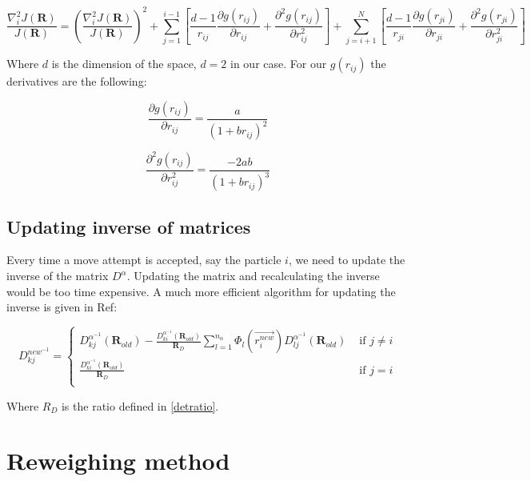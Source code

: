 \begin{equation}
  \dfrac{\nabla_i^2J(\bm{R})}{J(\bm{R})}=\left(\dfrac{\nabla_i^2J(\bm{R})}{J(\bm{R})}\right)^2
  + \sum_{j=1}^{i-1}\left[ \dfrac{d-1}{r_{ij}}\dfrac{\partial g(r_{ij})}{\partial r_{ij}} + \dfrac{\partial^2g(r_{ij})}{\partial r_{ij}^2} \right]
  + \sum_{j=i+1}^N\left[ \dfrac{d-1}{r_{ji}}\dfrac{\partial g(r_{ji})}{\partial r_{ji}} + \dfrac{\partial^2g(r_{ji})}{\partial r_{ji}^2} \right]
\end{equation}

Where $d$ is the dimension of the space, $d=2$ in our case.
For our $g(r_{ij})$ the derivatives are the following:

\begin{equation}
  \dfrac{\partial g(r_{ij})}{\partial r_{ij}}=\dfrac{a}{(1+br_{ij})^2}
\end{equation}

\begin{equation}
  \dfrac{\partial^2 g(r_{ij})}{\partial r_{ij}^2}=\dfrac{-2ab}{(1+br_{ij})^3}
\end{equation}

\subsection{Updating inverse of matrices}

Every time a move attempt is accepted, say the particle $i$, we need to update the inverse of the matrix $D^\alpha$.
Updating the matrix and recalculating the inverse would be too time expensive.
A much more efficient algorithm for updating the inverse is given in Ref\cite{notesOslo,MCMAbInitioQuantumChemistry,larsevind}:

\begin{equation}
  D_{kj}^{new^{-1}}=
  \begin{cases}
    D_{kj}^{\alpha^{-1}}(\bm{R}_{old})-\frac{D_{ki}^{\alpha^{-1}}(\bm{R}_{old})}{\bm{R}_D}\displaystyle\sum_{l=1}^{n_{\alpha}} \Phi_l(\vec{r_i^{new}})D_{lj}^{\alpha^{-1}}(\bm{R}_{old}) & \mbox{ if }j\neq i \\
    \frac{D_{ki}^{\alpha^{-1}}(\bm{R}_{old})}{\bm{R}_D} & \mbox{ if }j=i \\
  \end{cases}
\end{equation}

Where $R_{D}$ is the ratio defined in \autoref{detratio}.

\section{Reweighing method}
\label{reweight}

